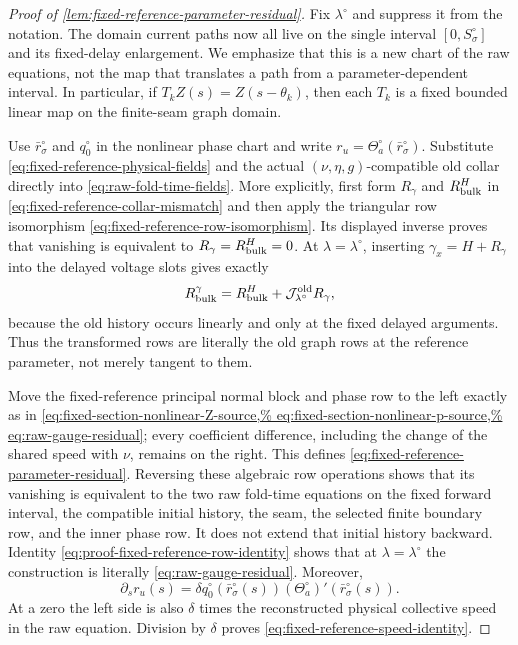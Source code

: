 \begin{proof}[Proof of
\cref{lem:fixed-reference-parameter-residual}]
Fix $\lambda^\circ$ and suppress it from the notation.  The domain current
paths now all live on the single interval $[0,S_\sigma^\circ]$ and its
fixed-delay enlargement.  We emphasize that this is a new chart of the raw
equations, not the map that translates a path from a parameter-dependent
interval.  In particular, if $T_kZ(s)=Z(s-\theta_k)$, then each $T_k$ is a
fixed bounded linear map on the finite-seam graph domain.

Use $\bar r_\sigma^\circ$ and $q_0^\circ$ in the nonlinear phase chart and
write $r_u=\Theta_a^\circ(\bar r_\sigma^\circ)$.  Substitute
\cref{eq:fixed-reference-physical-fields} and the actual
$(\nu,\eta,g)$-compatible old collar directly into
\cref{eq:raw-fold-time-fields}.  More explicitly, first form
$R_\gamma$ and $R_{\rm bulk}^{H}$ in
\cref{eq:fixed-reference-collar-mismatch} and then apply the triangular
row isomorphism \cref{eq:fixed-reference-row-isomorphism}.  Its displayed
inverse proves that vanishing is equivalent to
$R_\gamma=R_{\rm bulk}^{H}=0$.  At $\lambda=\lambda^\circ$, inserting
$\gamma_x=H+R_\gamma$ into the delayed voltage slots gives exactly
\begin{equation}
 R_{\rm bulk}^{\gamma}
 =R_{\rm bulk}^{H}
   +\mathcal J_{\lambda^\circ}^{\rm old}R_\gamma, \label{eq:proof-fixed-reference-row-identity}
\end{equation}
because the old history occurs linearly and only at the fixed delayed
arguments.  Thus the transformed rows are literally the old graph rows at
the reference parameter, not merely tangent to them.

Move the fixed-reference principal normal
block and phase row to the left exactly as in
\cref{eq:fixed-section-nonlinear-Z-source,%
eq:fixed-section-nonlinear-p-source,%
eq:raw-gauge-residual}; every coefficient difference, including the
change of the shared speed with $\nu$, remains on the right.  This defines
\cref{eq:fixed-reference-parameter-residual}.  Reversing these algebraic
row operations shows that its vanishing is equivalent to the two raw
fold-time equations on the fixed forward interval, the compatible initial
history, the seam, the selected finite boundary row, and the inner phase
row.  It does not extend that initial history backward.  Identity
\cref{eq:proof-fixed-reference-row-identity} shows that at
$\lambda=\lambda^\circ$ the construction is literally
\cref{eq:raw-gauge-residual}.
Moreover,
\[
 \partial_sr_u(s)
 =\delta q_0^\circ(\bar r_\sigma^\circ(s))
       (\Theta_a^\circ)'(\bar r_\sigma^\circ(s)).
\]
At a zero the left side is also $\delta$ times the reconstructed physical
collective speed in the raw equation.  Division by $\delta$ proves
\cref{eq:fixed-reference-speed-identity}.


\end{proof}
